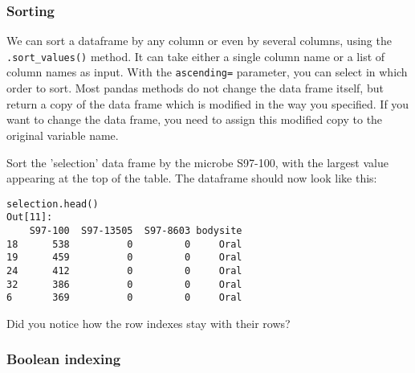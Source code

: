 \documentclass[12pt]{article}
\begin{document}
\subsubsection{Sorting}
We can sort a dataframe by any column or even by several columns, using the \verb|.sort_values()| method. It can take either a single column name or a list of column names as input. With the \verb|ascending=| parameter, you can select in which order to sort. Most pandas methods do not change the data frame itself, but return a copy of the data frame which is modified in the way you specified. If you want to change the data frame, you need to assign this modified copy to the original variable name.

Sort the 'selection' data frame by the microbe S97-100, with the largest value appearing at the top of the table. The dataframe should now look like this:

\begin{verbatim}
selection.head()
Out[11]: 
    S97-100  S97-13505  S97-8603 bodysite
18      538          0         0     Oral
19      459          0         0     Oral
24      412          0         0     Oral
32      386          0         0     Oral
6       369          0         0     Oral

\end{verbatim}
Did you notice how the row indexes stay with their rows?

\subsubsection{Boolean indexing}
\end{document}
